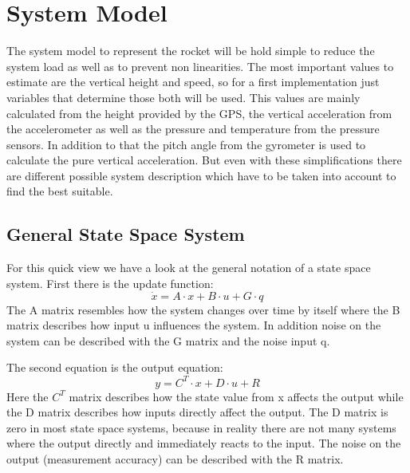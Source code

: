   \section{System Model}
  The system model to represent the rocket will be hold simple to reduce the system load as well as to prevent non linearities.
  The most important values to estimate are the vertical height and speed, so
  for a first implementation just variables that determine those both will be used.
  This values are mainly calculated from the height provided by the GPS, the vertical acceleration from the accelerometer
  as well as the pressure and temperature from the pressure sensors. In addition to that the pitch angle from the gyrometer is used to calculate the pure vertical acceleration.
  But even with these simplifications there are different possible system description which have to be taken into account
  to find the best suitable.

  \subsection{General State Space System}
  For this quick view we have a look at the general notation of a state space system. First there is the update function:
  $$ \dot{x} = A \cdot x + B \cdot u + G \cdot q$$
  The A matrix resembles how the system changes over time by itself where the B matrix describes how input u influences the system.
  In addition noise on the system can be described with the G matrix and the noise input q.

  The second equation is the output equation:
  $$ y = C^T \cdot x + D \cdot u + R $$
  Here the $C^T$ matrix describes how the state value from x affects the output while the D matrix describes how inputs directly affect the output.
  The D matrix is zero in most state space systems, because in reality there are not many systems where the output directly and immediately reacts to the input.
  The noise on the output (measurement accuracy) can be described with the R matrix.

